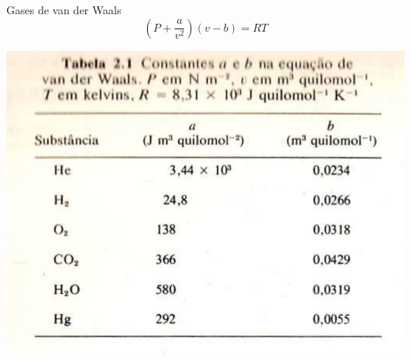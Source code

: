 \documentclass[t,%
brazilian,%
11pt,%
aspectratio=169,%
table%
]{beamer}
\begin{document}
\begin{frame}[c]{Gases de van der Waals}
\[
    \left(P+\frac{a}{v^2}\right)(v-b)=RT
\]

\centering
\includegraphics[height=\textheight-70pt]{images/Captura de tela de 2023-04-12 07-51-46.png}
\end{frame}



\end{document}
